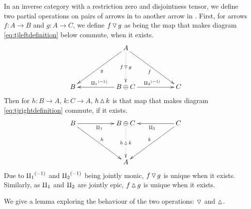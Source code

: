 \begin{definition}\label{def:up_triangle_and_down_triangle}
  In an inverse category \X with a restriction zero and disjointness tensor, we define two partial
  operations on pairs of arrows in \X to another arrow in \X. First, for arrows
  $f:A \to B$ and $g:A \to C$, we define $f\operatorname{\triangledown} g$ as
  being the map that makes diagram \eqref{eq:tjleftdefinition} below commute, when it exists.
  \begin{equation}
    \xymatrix@C+0pt @R+20pt{
      &&A \ar[dll]^{g} \ar[drr]_{f} \ar@{.>}[d]|-{f\tjleft g}\\
      B&&B\+C \ar[ll]_{\icpa} \ar[rr]^{\icpb} && C
      }\label{eq:tjleftdefinition}
  \end{equation}
  Then for $h:B \to A$, $k: C \to A$, $h\operatorname{\vartriangle} k$ is that map that makes diagram
  \eqref{eq:tjrightdefinition} commute, if it exists.
  \begin{equation}
    \xymatrix@C+0pt @R+20pt{
      B\ar[rr]_{\cpa} \ar[drr]^{h} &&B\+C   \ar@{.>}[d]|-{h\tjright k}
        && C \ar[ll]^{\cpb} \ar[dll]_{k}\\
      &&A
      }\label{eq:tjrightdefinition}
  \end{equation}
  Due to ${\amalg_{1}}^{(-1)}$ and ${\amalg_{2}}^{(-1)}$ being jointly monic, $f\operatorname{\triangledown} g$ is unique when it exists.
  Similarly, as $\amalg_{1}$ and $\amalg_{2}$ are jointly epic, $f\operatorname{\vartriangle} g$ is unique when it exists.
\end{definition}

We give a lemma exploring the
behaviour of the two operations: $\operatorname{\triangledown}$ and $\operatorname{\vartriangle}$.

